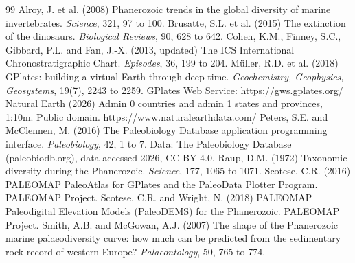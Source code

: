 \documentclass[11pt,a4paper]{article}
\begin{document}
\begin{thebibliography}{99}
 Alroy, J. et al. (2008) Phanerozoic trends in the global diversity of marine invertebrates. \emph{Science}, 321, 97 to 100.
 Brusatte, S.L. et al. (2015) The extinction of the dinosaurs. \emph{Biological Reviews}, 90, 628 to 642.
 Cohen, K.M., Finney, S.C., Gibbard, P.L. and Fan, J.-X. (2013, updated) The ICS International Chronostratigraphic Chart. \emph{Episodes}, 36, 199 to 204.
 Müller, R.D. et al. (2018) GPlates: building a virtual Earth through deep time. \emph{Geochemistry, Geophysics, Geosystems}, 19(7), 2243 to 2259. GPlates Web Service: \url{https://gws.gplates.org/}
 Natural Earth (2026) Admin 0 countries and admin 1 states and provinces, 1:10m. Public domain. \url{https://www.naturalearthdata.com/}
 Peters, S.E. and McClennen, M. (2016) The Paleobiology Database application programming interface. \emph{Paleobiology}, 42, 1 to 7. Data: The Paleobiology Database (paleobiodb.org), data accessed 2026, CC BY 4.0.
 Raup, D.M. (1972) Taxonomic diversity during the Phanerozoic. \emph{Science}, 177, 1065 to 1071.
 Scotese, C.R. (2016) PALEOMAP PaleoAtlas for GPlates and the PaleoData Plotter Program. PALEOMAP Project.
 Scotese, C.R. and Wright, N. (2018) PALEOMAP Paleodigital Elevation Models (PaleoDEMS) for the Phanerozoic. PALEOMAP Project.
 Smith, A.B. and McGowan, A.J. (2007) The shape of the Phanerozoic marine palaeodiversity curve: how much can be predicted from the sedimentary rock record of western Europe? \emph{Palaeontology}, 50, 765 to 774.
\end{thebibliography}
\end{document}
